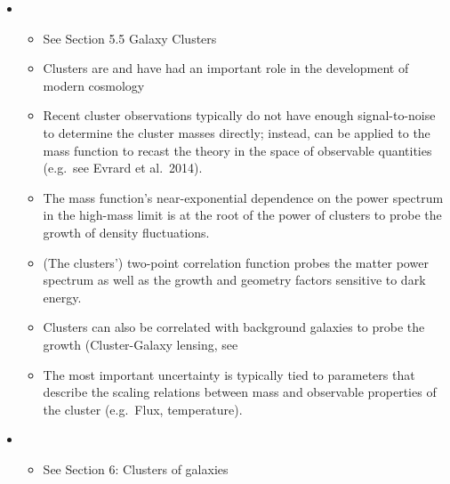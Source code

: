 \documentclass[letterpaper,10pt,english]{sphinxmanual}
\begin{document}
\begin{itemize}
\item {} 
\begin{itemize}
\item {} 
See Section 5.5 Galaxy Clusters

\item {} 
Clusters are 
and have had an important role in the development of modern
cosmology

\item {} 
Recent cluster observations typically do not have enough
signal-to-noise to determine the cluster masses directly; instead,
 can be applied to the mass function to recast
the theory in the space of observable quantities (e.g. see Evrard
et al. 2014).

\item {} 
The mass function’s near-exponential dependence on the power
spectrum in the high-mass limit is at the root of the power of
clusters to probe the growth of density fluctuations.

\item {} 
(The clusters’) two-point correlation function probes the matter
power spectrum as well as the growth and geometry factors
sensitive to dark energy.

\item {} 
Clusters can also be correlated with background galaxies to probe
the growth (Cluster-Galaxy lensing, see 

\item {} 
The most important uncertainty is typically tied to parameters
that describe the scaling relations between mass and observable
properties of the cluster (e.g. Flux, temperature).

\end{itemize}

\item {} 
\begin{itemize}
\item {} 
See Section 6: Clusters of galaxies

\end{itemize}

\end{itemize}
\end{document}
